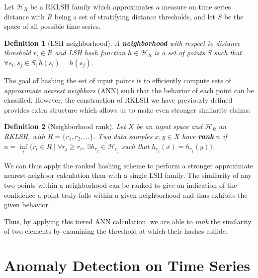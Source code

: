 \documentclass[a4paper]{article}
\theoremstyle{def}
\newtheorem{definition}{Definition}
\theoremstyle{thm}
\newcommand{\LSH}[0]{\mathcal{H}}
\begin{document}
Let ${\LSH}_R$ be a RKLSH family which approximates a measure on time series distance with $R$ being a set of stratifying distance thresholds, and let $S$ be the space of all possible time series.


\begin{definition}[LSH neighborhood]\label{defn:neighborhood}
    A \textbf{neighborhood} with respect to distance threshold $r_i \in R$ and LSH hash function $h \in {\LSH}_R$ is a set of points $S$ such that $\forall s_i, s_j \in S, h(s_i) = h(s_j)$.
\end{definition}

The goal of hashing the set of input points is to efficiently compute sets of \textit{approximate nearest neighbors} (ANN) such that the behavior of each point can be classified.
However, the construction of RKLSH we have previously defined provides extra structure which allows us to make even stronger similarity claims:

\begin{definition}[Neighborhood rank]\label{defn:neighborhood_rank}
    Let $X$ be an input space and ${\LSH}_R$ an RKLSH, with $R = \{r_1, r_2, \ldots\}$.
    Two data samples $x,y \in X$ have \textbf{rank} $n$ if $n = \inf\limits_i\{ r_i \in R \mid \forall r_j \ge r_i,~\exists h_{r_j} \in {\LSH}_{r_j}$ such that $h_{r_j}(x) = h_{r_j}(y) \}$.
\end{definition}

We can thus apply the ranked hashing scheme to perform a stronger approximate nearest-neighbor calculation than with a single LSH family.
The similarity of any two points within a neighborhood can be ranked to give an indication of the confidence a point truly falls within a given neighborhood and thus exhibits the given behavior.

Thus, by applying this tiered ANN calculation, we are able to \textit{rank} the similarity of two elements by examining the threshold at which their hashes collide.

\section{Anomaly Detection on Time Series}
\label{subsec:anomaly_detection}
\label{sec:proposed_scheme}
\end{document}
